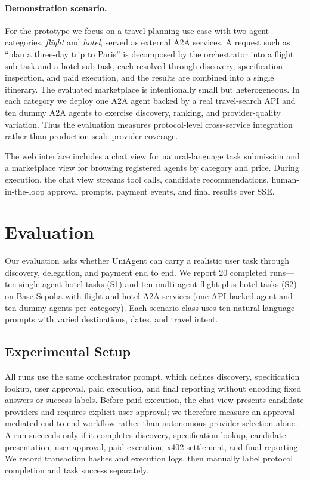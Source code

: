 \documentclass[sigconf]{acmart}
\begin{document}
\paragraph{Demonstration scenario.}
For the prototype we focus on a travel-planning use case with two agent
categories, \emph{flight} and \emph{hotel}, served as external A2A
services. A request such as ``plan a three-day trip to Paris'' is
decomposed by the orchestrator into a flight sub-task and a hotel
sub-task, each resolved through discovery, specification inspection, and
paid execution, and the results are combined into a single itinerary.
The evaluated marketplace is intentionally small but heterogeneous. In
each category we deploy one A2A agent backed by a real travel-search API
and ten dummy A2A agents to exercise discovery, ranking, and
provider-quality variation. Thus the evaluation measures protocol-level
cross-service integration rather than production-scale provider coverage.

The web interface includes a chat view for natural-language task
submission and a marketplace view for browsing registered agents by
category and price. During execution, the chat view streams tool calls,
candidate recommendations, human-in-the-loop approval prompts, payment
events, and final results over SSE.

\section{Evaluation}
\label{sec:evaluation}

Our evaluation asks whether UniAgent can carry a realistic user task
through discovery, delegation, and payment end to end. We report 20
completed runs---ten single-agent hotel tasks (S1) and ten multi-agent
flight-plus-hotel tasks (S2)---on Base Sepolia with flight and hotel A2A
services (one API-backed agent and ten dummy agents per category). Each
scenario class uses ten natural-language prompts with varied destinations,
dates, and travel intent.

\subsection{Experimental Setup}
All runs use the same orchestrator prompt, which defines discovery,
specification lookup, user approval, paid execution, and final reporting
without encoding fixed answers or success labels. Before paid execution,
the chat view presents candidate providers and requires explicit user
approval; we therefore measure an approval-mediated end-to-end workflow
rather than autonomous provider selection alone. A run succeeds only if it
completes discovery, specification lookup, candidate presentation, user
approval, paid execution, x402 settlement, and final reporting. We record
transaction hashes and execution logs, then manually label protocol
completion and task success separately.
\end{document}
